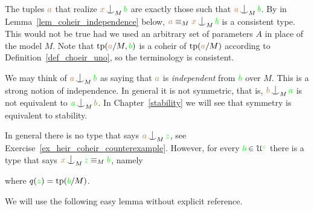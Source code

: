 The tuples ${\color{brown} a}$ that realize ${\mr x}\nonfork_M{\gr b}$ are exactly those such that ${\mr a}\nonfork_M{\gr b}$.
By { }in Lemma~\ref{lem_coheir_independence} below, ${\mr a}\equiv_M{\mr x}\nonfork_M{\gr b}$ is a consistent type.
This would not be true had we used an arbitrary set of parameters $A$ in place of the model $M$.
Note that ${\rm tp}({\color{brown} a}/M,{\color{green} b})$ is a coheir of ${\rm tp}({\color{brown} a}/M)$ according to Definition~\ref{def_choeir_uno}, so the terminology is consistent.

We may think of ${\mr a}\nonfork_M{\gr b}$ as saying that 
${\color{brown} a}$ is \emph{independent\/} from ${\color{green} b}$ over $M$.
This is a strong notion of independence.
In general it is not symmetric, that is, ${\mr b}\nonfork_M{\gr a}$ is not equivalent to ${\gr a}\nonfork_M{\mr b}$. In Chapter~\ref{stability} we will see that symmetry is equivalent to stability.

\begin{remark}\label{rem_heir_type}
  In general there is no type that says ${\mr a}\nonfork_M{\gr z}$, see Exercise~\ref{ex_heir_coheir_counterexample}.
  However, for every ${\color{green} b}\in\EuScript U^{\color{green} z}$ there is a type that says ${\mr x}\nonfork_M{\gr z}\equiv_M{\gr b}$, namely\smallskip

  \smallskip

  where $q({\color{green} z})={\rm tp}({\color{green} b}/M)$.
\end{remark}

We will use the following easy lemma without explicit reference.

